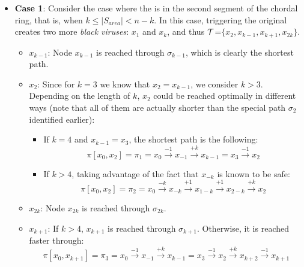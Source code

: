\begin{itemize}
\item {\bf Case 1}: Consider the case where the \bv is in the second segment of the chordal ring, that is, when $k\leq |S_{area}| <n-k$. In this case, triggering the original \bv creates two more {\it black viruses}: $x_{1}$ and $x_{k}$, and thus $\cal T$=$\{x_{2},x_{k-1},x_{k+1},x_{2k}\}$.
\begin{itemize}

\item  $x_{k-1}$:  Node  $x_{k-1}$ is reached through $\sigma_{k-1}$, which is clearly  the shortest path.

\item $x_{2}$: Since for   $k=3$ we know that $x_2 =  x_{k-1}$, we  consider $k>3$.\\
Depending on the length of $k$,  $x_{2}$  could be reached  optimally  in different ways (note that  all of them are actually shorter than  the special  path $\sigma_2$ identified earlier):\\


 \begin{itemize} 
 \item If  $k = 4$ and $x_{k-1}=x_3$,  the shortest path is the following: %
$$ \pi[x_0,x_2] =   \pi_{1} =   x_{0}\xrightarrow {-1}x_{-1} \xrightarrow {+k}x_{k-1}=x_3\xrightarrow {-1}x_{2}$$
\item If   $k > 4$, taking advantage of the fact that $x_{-k}$ is known to be safe: 
$$ \pi[x_0,x_2] =   \pi_{2}  =   x_{0}\xrightarrow {-k}x_{-k} \xrightarrow {+1}x_{1-k}\xrightarrow {+1}x_{2-k}\xrightarrow {+k}x_{2}$$
\end{itemize}


\item $x_{2k}$:    Node  $x_{2k}$ is reached through $\sigma_{2k}$.
% 


\item$x_{k+1}$: 
If $ k >4$,    $x_{k+1}$ is reached through $\sigma_{k+1}$. 
Otherwise, it is reached faster  through:
$$ \pi[x_0,x_{k+1}] =    \pi_{3} =   x_{0}\xrightarrow {-1}x_{-1} \xrightarrow {+k}x_{k-1}=x_3 \xrightarrow {-1}x_{2}\xrightarrow {+k}x_{k+2}\xrightarrow {-1}x_{k+1}$$


\end{itemize}
\end{itemize}
